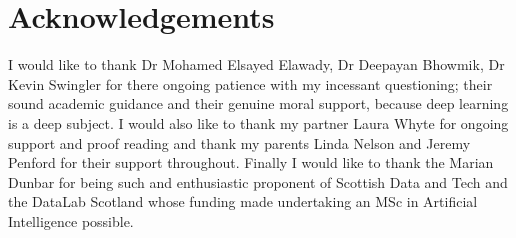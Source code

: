\chapter*{Acknowledgements}

I would like to thank  Dr Mohamed Elsayed Elawady, Dr Deepayan Bhowmik, Dr Kevin Swingler for there ongoing patience with my incessant questioning; their sound academic guidance and their genuine moral support, because deep learning is a deep subject. I would also like to thank my partner Laura Whyte for ongoing support and proof reading and thank my parents Linda Nelson and Jeremy Penford for their support throughout. Finally I would like to thank the Marian Dunbar for being such and enthusiastic proponent of Scottish Data and Tech and  the DataLab Scotland whose funding made undertaking an MSc in Artificial Intelligence possible.  
    


